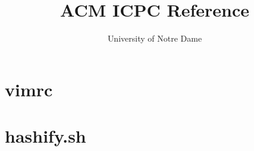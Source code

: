 \documentclass[a4paper,oneside]{article}
\title{ACM ICPC Reference}
\author{University of Notre Dame}
\begin{document}
\maketitle
\thispagestyle{fancy}
\tableofcontents
\newpage

\section{vimrc}


\section{hashify.sh}

\end{document}
